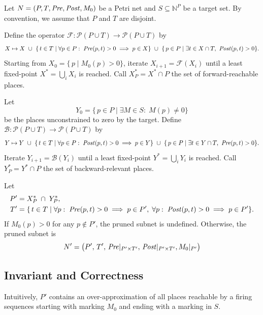 Let $N=(P,T,\mathit{Pre},\mathit{Post}, M_0)$ be a Petri net and $S\subseteq\mathbb{N}^P$ be a target set.
%
By convention, we assume that $P$ and $T$ are disjoint.
 
\begin{definition}
	Define the operator $\mathcal{F}:\mathcal{P}(P\cup T)\to\mathcal{P}(P\cup T)$ by
	\[
	X \mapsto X
	~\cup~
	\{\,t\in T \mid \forall p\in P:\; \mathit{Pre}(p,t)>0 \implies p\in X\}
	~\cup~
	\{\,p\in P \mid \exists t\in X\cap T,\ \mathit{Post}(p,t)>0\}.
	\]
	Starting from $X_0 = \{\,p\mid M_0(p)>0\}$, iterate
	$X_{i+1} = \mathcal{F}(X_i)$ until a least fixed-point
	$X^*=\bigcup_i X_i$ is reached.  Call $X^*_P = X^*\cap P$ the set of
	forward-reachable places.
\end{definition}

\begin{definition}
	Let
	\[
	Y_0 = \{\,p\in P \mid \exists M\in S:\;M(p)\neq0\}
	\]
	be the places unconstrained to zero by the target.  Define
	$\mathcal{B}:\mathcal{P}(P\cup T)\to\mathcal{P}(P\cup T)$ by
	\[
	Y \mapsto Y
	~\cup~
	\{\,t\in T \mid \forall p\in P:\; \mathit{Post}(p,t)>0 \implies p\in Y\}
	~\cup~
	\{\,p\in P \mid \exists t\in Y\cap T,\ \mathit{Pre}(p,t)>0\}.
	\]
	Iterate $Y_{i+1} = \mathcal{B}(Y_i)$ until a least fixed-point
	$Y^*=\bigcup_i Y_i$ is reached.  Call $Y^*_P = Y^*\cap P$ the set of
	backward-relevant places.
\end{definition}

\begin{definition}
  Let
  \begin{align*}
    P' &= X^*_P \;\cap\; Y^*_P,
    \\
    T' &= \{\,t\in T \mid
    \forall p:\;\mathit{Pre}(p,t)>0\implies p\in P',\;
    \forall p:\;\mathit{Post}(p,t)>0\implies p\in P'
    \}.
  \end{align*}
  If $M_0(p) > 0$ for any $p \not\in P'$, the pruned subnet is undefined.
  Otherwise, the pruned subnet is
  \[
  N' = \bigl(P',\,T',\,\mathit{Pre}|_{P'\times T'},\,\mathit{Post}|_{P'\times T'}, M_0|_{P'}\bigr)
  \]
\end{definition}

\subsection{Invariant and Correctness}

Intuitively, $P'$ contains an over-approximation of all places reachable by a firing sequences starting with marking $M_0$ and ending with a marking in $S$.

